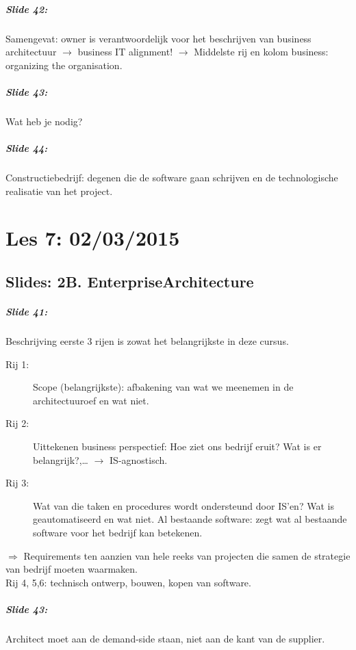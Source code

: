 \documentclass[10pt,a4paper]{report}
\begin{document}
\paragraph{Slide 42:}Samengevat: owner is verantwoordelijk voor het beschrijven van business architectuur $\rightarrow$ business IT alignment! $\rightarrow$ Middelste rij en kolom business: organizing the organisation.

\paragraph{Slide 43:}Wat heb je nodig?

\paragraph{Slide 44:}Constructiebedrijf: degenen die de software gaan schrijven en de technologische realisatie van het project.

\chapter{Les 7: 02/03/2015}
\section{Slides: 2B. EnterpriseArchitecture}
\paragraph{Slide 41:}Beschrijving eerste 3 rijen is zowat het belangrijkste in deze cursus. 
\begin{description}
\item[Rij 1:]Scope (belangrijkste): afbakening van wat we meenemen in de architectuuroef en wat niet. 
\item[Rij 2:]Uittekenen business perspectief: Hoe ziet ons bedrijf eruit? Wat is er belangrijk?,… $\rightarrow$ IS-agnostisch. 
\item[Rij 3:]Wat van die taken en procedures wordt ondersteund door IS'en? Wat is geautomatiseerd en wat niet. Al bestaande software: zegt wat al bestaande software voor het bedrijf kan betekenen.
\end{description}
$\Rightarrow$ Requirements ten aanzien van hele reeks van projecten die samen de strategie van bedrijf moeten waarmaken.\\
Rij 4, 5,6: technisch ontwerp, bouwen, kopen van software.

\paragraph{Slide 43:}Architect moet aan de demand-side staan, niet aan de kant van de supplier.
\end{document}
